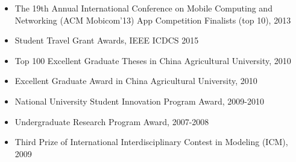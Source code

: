 \documentclass[letter]{article}
\newenvironment{tightitem}
{\begin{itemize}
\setlength{\itemsep}{1pt}
\setlength{\parskip}{0pt}
\setlength{\parsep}{0pt}}
{\end{itemize}}
\begin{document}
\begin{description}
\begin{tightitem}
\item The 19th Annual International Conference on Mobile Computing and Networking (ACM Mobicom'13) App Competition Finalists (top 10), 2013
\item Student Travel Grant Awards, IEEE ICDCS 2015
\item Top 100 Excellent Graduate Theses in China Agricultural University, 2010
\item  Excellent Graduate Award in China Agricultural University, 2010
\item   National University Student Innovation Program Award, 2009-2010
\item  Undergraduate Research Program Award, 2007-2008
\item Third Prize of International Interdisciplinary Contest in Modeling (ICM), 2009
\end{tightitem}


\end{description}
\end{document}

